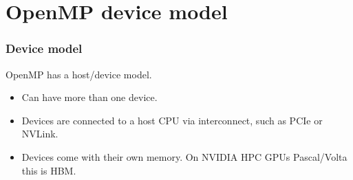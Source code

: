 \documentclass{beamer}
\begin{document}
\section{OpenMP device model}
\begin{frame}
\frametitle{Device model}
OpenMP has a host/device model.

\begin{center}
\end{center}

\begin{itemize}
  \item Can have more than one device.
  \item Devices are connected to a host CPU via interconnect, such as PCIe or NVLink.
  \item Devices come with their own memory. On NVIDIA HPC GPUs Pascal/Volta this is HBM.
\end{itemize}


\end{frame}
\end{document}
